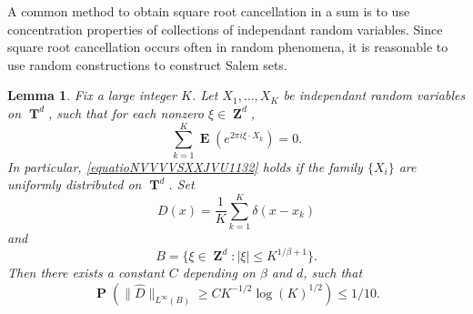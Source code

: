 \documentclass[12pt,reqno]{article}
\numberwithin{equation}{section}
\DeclareMathOperator{\ZZ}{\mathbf{Z}}
\DeclareMathOperator{\TT}{\mathbf{T}}
\newtheorem{lemma}{Lemma}
\DeclareMathOperator{\EE}{\mathbf{E}}
\DeclareMathOperator{\PP}{\mathbf{P}}
\begin{document}
A common method to obtain square root cancellation in a sum is to use concentration properties of collections of independant random variables. Since square root cancellation occurs often in random phenomena, it is reasonable to use random constructions to construct Salem sets.

\begin{lemma} \label{LemmaGISCICS1}
    Fix a large integer $K$. Let $X_1, \dots, X_K$ be independant random variables on $\TT^d$, such that for each nonzero $\xi \in \ZZ^d$,
    \begin{equation} \label{equatioNVVVVSXXJVU1132}
        \sum_{k = 1}^K \EE \left( e^{2 \pi i \xi \cdot X_k} \right) = 0.
    \end{equation}
    In particular, \eqref{equatioNVVVVSXXJVU1132} holds if the family $\{ X_i \}$ are uniformly distributed on $\TT^d$. Set
    \[ D(x) = \frac{1}{K} \sum_{k = 1}^K \delta(x - x_k) \]
    and
    \[ B = \{ \xi \in \ZZ^d: |\xi| \leq K^{1/\beta + 1} \}. \]
    Then there exists a constant $C$ depending on $\beta$ and $d$, such that
    \[ \PP \left( \| \widehat{D} \|_{L^\infty(B)} \geq C K^{-1/2} \log(K)^{1/2} \right) \leq 1/10. \]
\end{lemma}
\end{document}
